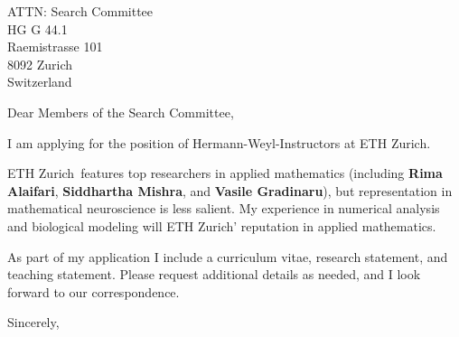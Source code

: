 \documentclass[11pt,a4paper]{letter}
\begin{document}

\def\School{ETH Zurich}

\begin{letter}
{ATTN: Search Committee\\
HG G 44.1\\
Raemistrasse 101\\
8092 Zurich\\
Switzerland
}


\opening{Dear Members of the Search Committee,}

I am applying for the position of Hermann-Weyl-Instructors at \School. 



\School~features top researchers in applied mathematics (including \textbf{Rima Alaifari}, \textbf{Siddhartha Mishra}, and \textbf{Vasile Gradinaru}), but representation in mathematical neuroscience is less salient. My experience in numerical analysis and biological modeling will \School' reputation in applied mathematics.



As part of my application I include a curriculum vitae, research statement, and teaching statement. Please request additional details as needed, and I look forward to our correspondence.

\closing{Sincerely,}
\end{letter}
\end{document}
